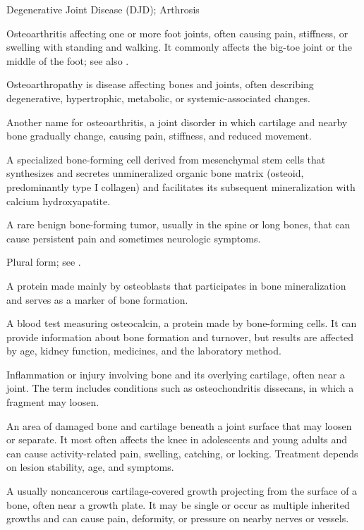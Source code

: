 \synonyms
Degenerative Joint Disease (DJD); Arthrosis

 Osteoarthritis affecting one or more foot joints, often causing pain, stiffness, or swelling with standing and walking. It commonly affects the big-toe joint or the middle of the foot; see also .

 Osteoarthropathy is disease affecting bones and joints, often describing degenerative, hypertrophic, metabolic, or systemic-associated changes.

 Another name for osteoarthritis, a joint disorder in which cartilage and nearby bone gradually change, causing pain, stiffness, and reduced movement.

 A specialized bone-forming cell derived from mesenchymal stem cells that synthesizes and secretes unmineralized organic bone matrix (osteoid, predominantly type I collagen) and facilitates its subsequent mineralization with calcium hydroxyapatite.

 A rare benign bone-forming tumor, usually in the spine or long bones, that can cause persistent pain and sometimes neurologic symptoms.

 Plural form; see .

 A protein made mainly by osteoblasts that participates in bone mineralization and serves as a marker of bone formation.

 A blood test measuring osteocalcin, a protein made by bone-forming cells. It can provide information about bone formation and turnover, but results are affected by age, kidney function, medicines, and the laboratory method.

 Inflammation or injury involving bone and its overlying cartilage, often near a joint. The term includes conditions such as osteochondritis dissecans, in which a fragment may loosen.

 An area of damaged bone and cartilage beneath a joint surface that may loosen or separate. It most often affects the knee in adolescents and young adults and can cause activity-related pain, swelling, catching, or locking. Treatment depends on lesion stability, age, and symptoms.

 A usually noncancerous cartilage-covered growth projecting from the surface of a bone, often near a growth plate. It may be single or occur as multiple inherited growths and can cause pain, deformity, or pressure on nearby nerves or vessels.

